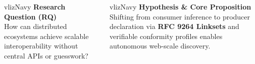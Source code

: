 \documentclass[
  25pt,
  a0paper,
  portrait,
  margin=0mm,
  innermargin=16mm,
  blockverticalspace=7mm,
  colspace=16mm,
  subcolspace=8mm
]{tikzposter}
\begin{document}
\begin{columns}
{\begin{minipage}{0.488\linewidth}
\begin{tactilecard}[height=5.20cm,valign=center]{vlizNavy}
        {\fontsize{25pt}{29pt}\selectfont\color{vlizDeepNavy}\bfseries Research Question (RQ)}\\[5pt]
        How can distributed ecosystems achieve scalable interoperability without central APIs or guesswork?
      \end{tactilecard}
    \end{minipage}\par\vspace{0.32cm}
    \noindent
    \begin{minipage}{\linewidth}
      \begin{tactilecard}[height=4.90cm,valign=center]{vlizNavy}
        {\fontsize{25pt}{29pt}\selectfont\color{vlizDeepNavy}\bfseries Hypothesis \& Core Proposition}\\[5pt]
        Shifting from consumer inference to producer declaration via \textbf{RFC 9264 Linksets} and verifiable conformity profiles enables autonomous web-scale discovery.
      \end{tactilecard}
    \end{minipage}
  }


\end{columns}
\end{document}
